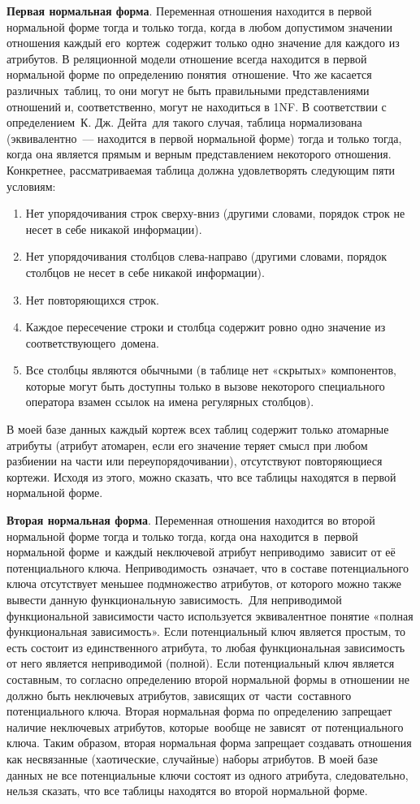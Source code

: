 \textbf{Первая нормальная форма}. Переменная отношения находится в первой нормальной форме тогда и только тогда, когда в любом допустимом значении отношения каждый его кортеж содержит только одно значение для каждого из атрибутов.
В реляционной модели отношение всегда находится в первой нормальной форме по определению понятия отношение.
Что же касается различных таблиц, то они могут не быть правильными представлениями отношений и, соответственно, могут не находиться в 1NF. В соответствии с определением К. Дж. Дейта для такого случая, таблица нормализована (эквивалентно — находится в первой нормальной форме) тогда и только тогда, когда она является прямым и верным представлением некоторого отношения. Конкретнее, рассматриваемая таблица должна удовлетворять следующим пяти условиям:
\begin{enumerate}
\item Нет упорядочивания строк сверху-вниз (другими словами, порядок строк не несет в себе никакой информации).
\item Нет упорядочивания столбцов слева-направо (другими словами, порядок столбцов не несет в себе никакой информации).
\item Нет повторяющихся строк.
\item Каждое пересечение строки и столбца содержит ровно одно значение из соответствующего домена.
\item Все столбцы являются обычными (в таблице нет «скрытых» компонентов, которые могут быть доступны только в вызове некоторого специального оператора взамен ссылок на имена регулярных столбцов).
\end{enumerate}
В моей базе данных каждый кортеж всех таблиц содержит только атомарные атрибуты (атрибут атомарен, если его значение теряет смысл при любом разбиении на части или переупорядочивании), отсутствуют повторяющиеся кортежи. Исходя из этого, можно сказать, что все таблицы находятся в первой нормальной форме.

\textbf{Вторая нормальная форма}. Переменная отношения находится во второй нормальной форме тогда и только тогда, когда она находится в первой нормальной форме и каждый неключевой атрибут неприводимо зависит от её потенциального ключа.
Неприводимость означает, что в составе потенциального ключа отсутствует меньшее подмножество атрибутов, от которого можно также вывести данную функциональную зависимость. Для неприводимой функциональной зависимости часто используется эквивалентное понятие «полная функциональная зависимость». Если потенциальный ключ является простым, то есть состоит из единственного атрибута, то любая функциональная зависимость от него является неприводимой (полной). Если потенциальный ключ является составным, то согласно определению второй нормальной формы в отношении не должно быть неключевых атрибутов, зависящих от части составного потенциального ключа.
Вторая нормальная форма по определению запрещает наличие неключевых атрибутов, которые вообще не зависят от потенциального ключа. Таким образом, вторая нормальная форма запрещает создавать отношения как несвязанные (хаотические, случайные) наборы атрибутов.
В моей базе данных не все потенциальные ключи состоят из одного атрибута, следовательно, нельзя сказать, что все таблицы находятся во второй нормальной форме.


